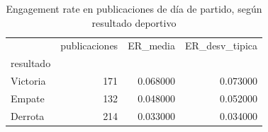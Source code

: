 \begin{table}
\caption{Engagement rate en publicaciones de día de partido, según resultado deportivo}
\label{tab:engagement_resultado}
\begin{tabular}{lrrr}
\toprule
 & publicaciones & ER\_media & ER\_desv\_tipica \\
resultado &  &  &  \\
\midrule
Victoria & 171 & 0.068000 & 0.073000 \\
Empate & 132 & 0.048000 & 0.052000 \\
Derrota & 214 & 0.033000 & 0.034000 \\
\bottomrule
\end{tabular}
\end{table}
